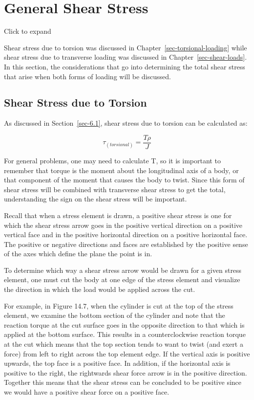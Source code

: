 \documentclass[
  letterpaper,
  DIV=11,
  numbers=noendperiod]{scrreprt}
\theoremstyle{definition}
\theoremstyle{remark}
\begin{document}
\section{General Shear Stress}\label{sec-14.2}

Click to expand

Shear stress due to torsion was discussed in
Chapter~\ref{sec-torsional-loading} while shear stress due to transverse
loading was discussed in Chapter~\ref{sec-shear-loads}. In this section,
the considerations that go into determining the total shear stress that
arise when both forms of loading will be discussed.

\subsection{Shear Stress due to
Torsion}\label{shear-stress-due-to-torsion}

As discussed in Section~\ref{sec-6.1}, shear stress due to torsion can
be calculated as:

\[
\tau_{(torsional)}=\frac{T \rho}{J}
\]

For general problems, one may need to calculate T, so it is important to
remember that torque is the moment about the longitudinal axis of a
body, or that component of the moment that causes the body to twist.
Since this form of shear stress will be combined with transverse shear
stress to get the total, understanding the sign on the shear stress will
be important.

Recall that when a stress element is drawn, a positive shear stress is
one for which the shear stress arrow goes in the positive vertical
direction on a positive vertical face and in the positive horizontal
direction on a positive horizontal face. The positive or negative
directions and faces are established by the positive sense of the axes
which define the plane the point is in.

To determine which way a shear stress arrow would be drawn for a given
stress element, one must cut the body at one edge of the stress element
and visualize the direction in which the load would be applied across
the cut.

For example, in Figure 14.7, when the cylinder is cut at the top of the
stress element, we examine the bottom section of the cylinder and note
that the reaction torque at the cut surface goes in the opposite
direction to that which is applied at the bottom surface. This results
in a counterclockwise reaction torque at the cut which means that the
top section tends to want to twist (and exert a force) from left to
right across the top element edge. If the vertical axis is positive
upwards, the top face is a positive face. In addition, if the horizontal
axis is positive to the right, the rightwards shear force arrow is in
the positive direction. Together this means that the shear stress can be
concluded to be positive since we would have a positive shear force on a
positive face.
\end{document}
